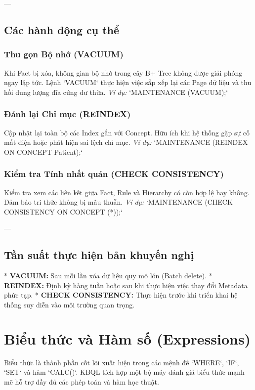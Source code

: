 ---

\subsection{Các hành động cụ thể}

\subsubsection{Thu gọn Bộ nhớ (VACUUM)}
Khi Fact bị xóa, không gian bộ nhớ trong cây B+ Tree không được giải phóng ngay lập tức. Lệnh `VACUUM` thực hiện việc sắp xếp lại các Page dữ liệu và thu hồi dung lượng đĩa cứng dư thừa.
\textit{Ví dụ:} `MAINTENANCE (VACUUM);`

\subsubsection{Đánh lại Chỉ mục (REINDEX)}
Cập nhật lại toàn bộ các Index gắn với Concept. Hữu ích khi hệ thống gặp sự cố mất điện hoặc phát hiện sai lệch chỉ mục.
\textit{Ví dụ:} `MAINTENANCE (REINDEX ON CONCEPT Patient);`

\subsubsection{Kiểm tra Tính nhất quán (CHECK CONSISTENCY)}
Kiểm tra xem các liên kết giữa Fact, Rule và Hierarchy có còn hợp lệ hay không. Đảm bảo tri thức không bị mâu thuẫn.
\textit{Ví dụ:} `MAINTENANCE (CHECK CONSISTENCY ON CONCEPT (*));`

---

\subsection{Tần suất thực hiện bản khuyến nghị}

*   \textbf{VACUUM:} Sau mỗi lần xóa dữ liệu quy mô lớn (Batch delete).
*   \textbf{REINDEX:} Định kỳ hàng tuần hoặc sau khi thực hiện việc thay đổi Metadata phức tạp.
*   \textbf{CHECK CONSISTENCY:} Thực hiện trước khi triển khai hệ thống suy diễn vào môi trường quan trọng.

\section{Biểu thức và Hàm số (Expressions)}

Biểu thức là thành phần cốt lõi xuất hiện trong các mệnh đề `WHERE`, `IF`, `SET` và hàm `CALC()`. KBQL tích hợp một bộ máy đánh giá biểu thức mạnh mẽ hỗ trợ đầy đủ các phép toán và hàm học thuật.

